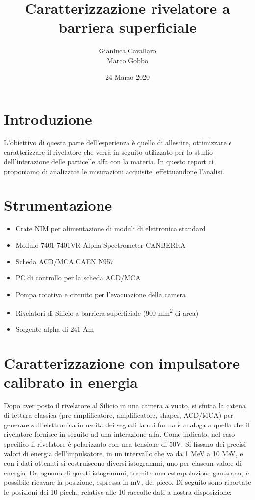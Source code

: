 \documentclass[a4paper,10pt]{article}
\title{Caratterizzazione rivelatore a barriera superficiale}
\author{Gianluca Cavallaro \\ Marco Gobbo}
\date{24 Marzo 2020}
\begin{document}
\maketitle
\section{Introduzione}
L'obiettivo di questa parte dell'esperienza è quello di allestire, ottimizzare e caratterizzare il rivelatore che verrà in seguito utilizzato per lo studio dell'interazione delle particelle alfa con la materia. In questo report ci proponiamo di analizzare le misurazioni acquisite, effettuandone l'analisi.
\section{Strumentazione}
\begin{itemize}
\item Crate NIM per alimentazione di moduli di elettronica standard
\item Modulo 7401-7401VR Alpha Spectrometer CANBERRA
\item Scheda ACD/MCA CAEN N957
\item PC di controllo per la scheda ACD/MCA
\item Pompa rotativa e circuito per l'evacuazione della camera
\item Rivelatori di Silicio a barriera superficiale (900 mm\textsuperscript{2} di area)
\item Sorgente alpha di 241-Am
\end{itemize}
\section{Caratterizzazione con impulsatore calibrato in energia}
Dopo aver posto il rivelatore al Silicio in una camera a vuoto, si sfutta la catena di lettura classica (pre-amplificatore, amplificatore, shaper, ACD/MCA) per generare sull'elettronica in uscita dei segnali la cui forma è analoga a quella che il rivelatore fornisce in seguito ad una interazione alfa. Come indicato, nel caso specifico il rivelatore è polarizzato con una tensione di 50V. Si fissano dei precisi valori di energia dell'impulsatore, in un intervallo che va da 1 MeV a 10 MeV, e con i dati ottenuti si costruiscono diversi istogrammi, uno per ciascun valore di energia. Da ognuno di questi istogrammi, tramite una estrapolazione gaussiana, è possibile ricavare la posizione, espressa in mV, del picco. Di seguito sono riportate le posizioni dei 10 picchi, relative alle 10 raccolte dati a nostra disposizione:\\
\end{document}
